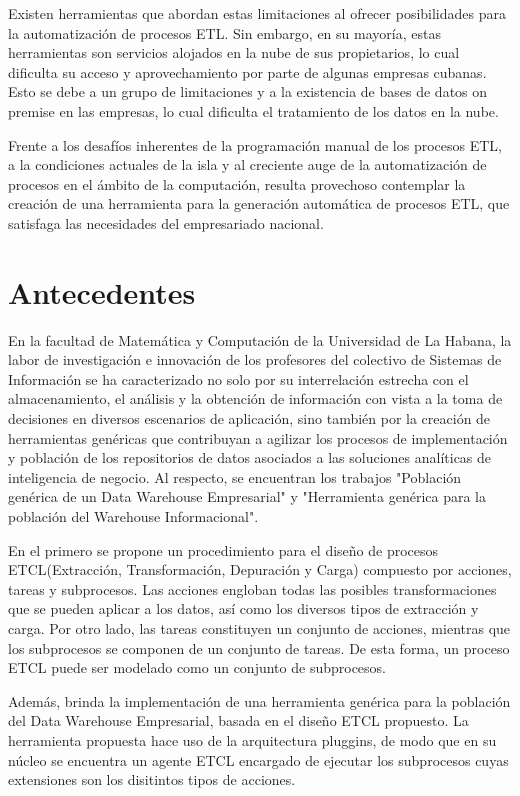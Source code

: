 Existen herramientas que abordan estas limitaciones al ofrecer posibilidades para la automatización de procesos ETL. 
Sin embargo, en su mayoría, estas herramientas son servicios alojados en la nube de sus propietarios, lo cual 
dificulta su acceso y aprovechamiento por parte de algunas empresas cubanas. Esto se debe a un grupo de limitaciones 
y a la existencia de bases de datos on premise en las empresas, lo cual 
dificulta el tratamiento de los datos en la nube.

Frente a los desafíos inherentes de la programaci\'on manual de los procesos ETL, a la condiciones actuales
de la isla y al creciente auge de la automatización de procesos en el ámbito de la computación, resulta 
provechoso contemplar la creación de una herramienta para la generación automática de procesos ETL, que satisfaga 
las necesidades del empresariado nacional.

\section{Antecedentes}

En la facultad de Matemática y Computación de la Universidad de La Habana, la labor de investigación e innovación de 
los profesores del colectivo de Sistemas de Información se ha caracterizado no solo por su interrelación estrecha 
con el almacenamiento, el análisis y la obtención de información con vista a la toma de decisiones en diversos 
escenarios de aplicación, sino también por la creación de herramientas genéricas que contribuyan a agilizar los 
procesos de implementación y población de los repositorios de datos asociados a las soluciones analíticas de 
inteligencia de negocio. Al respecto, se encuentran los trabajos "Población genérica
de un Data Warehouse Empresarial"\cite{mijailmaster} y "Herramienta genérica para la población del 
Warehouse Informacional"\cite{lismaster}.

En el primero se propone un procedimiento para el diseño de procesos ETCL(Extracci\'on, Transformaci\'on, Depuraci\'on y Carga) 
compuesto por acciones, tareas y subprocesos. Las acciones engloban todas las posibles transformaciones que se pueden 
aplicar a los datos, así como los diversos tipos de extracción y carga. Por otro lado, las tareas constituyen un 
conjunto de acciones, mientras que los subprocesos se componen de un conjunto de tareas. De esta forma, un proceso 
ETCL puede ser modelado como un conjunto de subprocesos.

Además, brinda la implementación de una herramienta genérica para la población del Data Warehouse Empresarial, basada en el 
diseño ETCL propuesto. La herramienta propuesta hace uso de la arquitectura pluggins\cite{noauthor_plug-architectures_nodate}, 
de modo que en su n\'ucleo se encuentra 
un agente ETCL encargado de ejecutar los subprocesos cuyas extensiones son los disitintos tipos de acciones.


